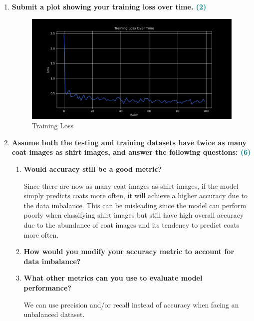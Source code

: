 \documentclass[a4paper]{article}
\begin{document}
\begin{sloppypar}
\begin{enumerate}[start=4,label=Q\arabic*,left=0pt]
    \item \textbf{Submit a plot showing your training loss over time. \hfill \textcolor{teal}{(2)}}

    \begin{figure}[H]
        \centering  
        \includegraphics[height=0.25\textheight]{Q5_training_loss.png}
        \caption{Training Loss}
        \label{fig:Q5_training_loss}
    \end{figure}

    \item \textbf{Assume both the testing and training datasets have twice as many coat images as
    shirt images, and answer the following questions: \hfill \textcolor{teal}{(6)}}
    \begin{enumerate}
        \item \textbf{Would accuracy still be a good metric?}
        
        \par Since there are now as many coat images as shirt images, if the model simply predicts 
        coats more often, it will achieve a higher accuracy due to the data imbalance. This can be misleading 
        since the model can perform poorly when classifying shirt images but still have high overall
        accuracy due to the abundance of coat images and its tendency to predict coats more often.

        \item \textbf{How would you modify your accuracy metric to account for data imbalance?}
        
        \par

        \item \textbf{What other metrics can you use to evaluate model performance?}
        
        \par We can use precision and/or recall instead of accuracy when facing an unbalanced dataset.


\end{enumerate}
\end{enumerate}
\end{sloppypar}
\end{document}
